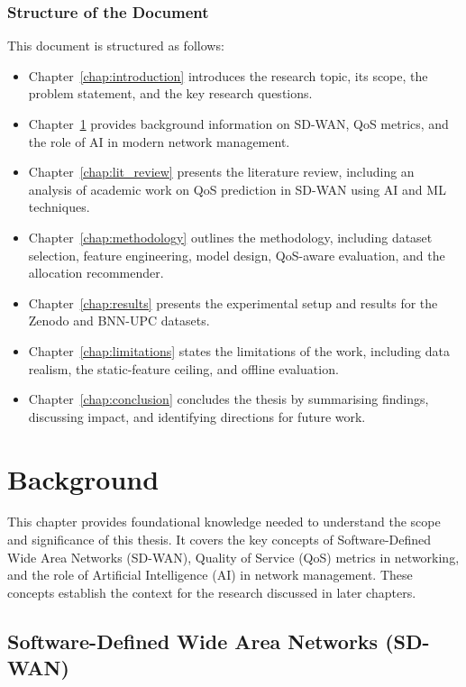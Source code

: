 \documentclass[a4paper,12pt]{Classes/RoboticsLaTeX}
\begin{document}
    \subsection*{Structure of the Document}
    
    This document is structured as follows:
    
    \begin{itemize}
        \item Chapter~\ref{chap:introduction} introduces the research topic, its scope, the problem statement, and the key research questions.
        \item Chapter~\ref{chap:backg} provides background information on SD-WAN, QoS metrics, and the role of AI in modern network management.
        \item Chapter~\ref{chap:lit_review} presents the literature review, including an analysis of academic work on QoS prediction in SD-WAN using AI and ML techniques.
        \item Chapter~\ref{chap:methodology} outlines the methodology, including dataset selection, feature engineering, model design, QoS-aware evaluation, and the allocation recommender.
        \item Chapter~\ref{chap:results} presents the experimental setup and results for the Zenodo and BNN-UPC datasets.
        \item Chapter~\ref{chap:limitations} states the limitations of the work, including data realism, the static-feature ceiling, and offline evaluation.
        \item Chapter~\ref{chap:conclusion} concludes the thesis by summarising findings, discussing impact, and identifying directions for future work.
    \end{itemize}


    \chapter{Background}
    \label{chap:backg}
    
    This chapter provides foundational knowledge needed to understand the scope and significance of this thesis. It covers the key concepts of Software-Defined Wide Area Networks (SD-WAN), Quality of Service (QoS) metrics in networking, and the role of Artificial Intelligence (AI) in network management. These concepts establish the context for the research discussed in later chapters.
    
    \section{Software-Defined Wide Area Networks (SD-WAN)}
    
\end{document}
